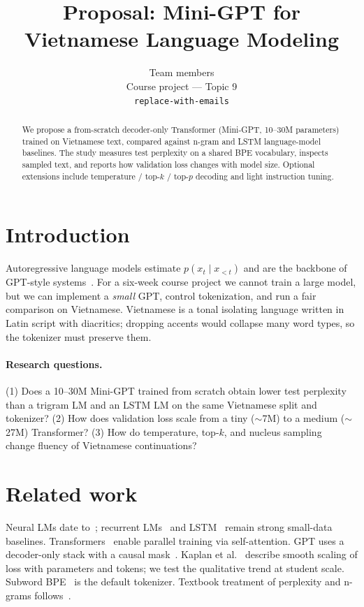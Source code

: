 \documentclass[11pt]{article}
\title{Proposal: Mini-GPT for Vietnamese Language Modeling}
\author{Team members \\
  Course project --- Topic 9 \\
  \texttt{replace-with-emails}}
\begin{document}
\maketitle

\begin{abstract}
We propose a from-scratch decoder-only Transformer (Mini-GPT, 10--30M parameters) trained on Vietnamese text, compared against n-gram and LSTM language-model baselines. The study measures test perplexity on a shared BPE vocabulary, inspects sampled text, and reports how validation loss changes with model size. Optional extensions include temperature / top-$k$ / top-$p$ decoding and light instruction tuning.
\end{abstract}

\section{Introduction}

Autoregressive language models estimate $p(x_t \mid x_{<t})$ and are the backbone of GPT-style systems~\cite{radford2018improving,radford2019language}. For a six-week course project we cannot train a large model, but we can implement a \emph{small} GPT, control tokenization, and run a fair comparison on Vietnamese. Vietnamese is a tonal isolating language written in Latin script with diacritics; dropping accents would collapse many word types, so the tokenizer must preserve them.

\paragraph{Research questions.}
(1) Does a 10--30M Mini-GPT trained from scratch obtain lower test perplexity than a trigram LM and an LSTM LM on the same Vietnamese split and tokenizer?
(2) How does validation loss scale from a tiny ($\sim$7M) to a medium ($\sim$27M) Transformer?
(3) How do temperature, top-$k$, and nucleus sampling~\cite{holtzman2020curious} change fluency of Vietnamese continuations?

\section{Related work}

Neural LMs date to~\cite{bengio2003neural}; recurrent LMs~\cite{mikolov2010recurrent} and LSTM~\cite{hochreiter1997lstm} remain strong small-data baselines. Transformers~\cite{vaswani2017attention} enable parallel training via self-attention. GPT uses a decoder-only stack with a causal mask~\cite{radford2018improving}. Kaplan et al.~\cite{kaplan2020scaling} describe smooth scaling of loss with parameters and tokens; we test the qualitative trend at student scale. Subword BPE~\cite{sennrich2016neural} is the default tokenizer. Textbook treatment of perplexity and n-grams follows~\cite{jurafsky2023slp}.
\end{document}
